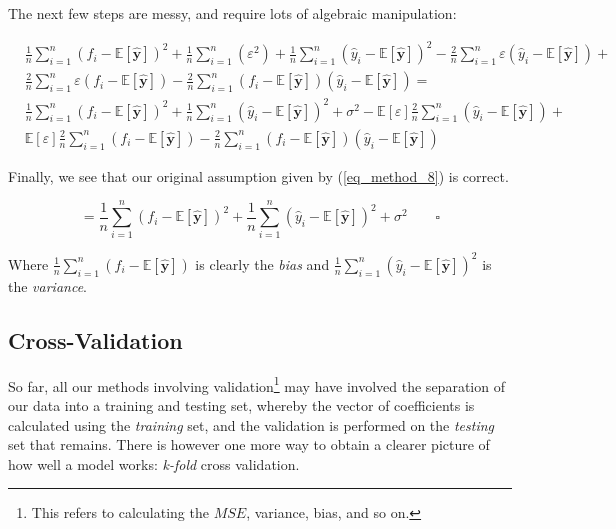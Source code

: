 \documentclass[a4paper,10pt,english]{article}
\begin{document}
The next few steps are messy, and require lots of algebraic manipulation:	

\begin{align*}	
& \frac{1}{n} \sum_{i=1}^{n} ( f_i - \mathbb{E}[\hat{\mathbf{y}}] )^2 
+ \frac{1}{n} \sum_{i=1}^{n} ( \varepsilon^2 )
+ \frac{1}{n} \sum_{i=1}^{n} ( \hat{y}_i - \mathbb{E}[\hat{\mathbf{y}}] )^2 
- \frac{2}{n} \sum_{i=1}^{n} \varepsilon ( \hat{y}_i - \mathbb{E}[\hat{\mathbf{y}}] )
+ \\ &\frac{2}{n} \sum_{i=1}^{n} \varepsilon ( f_i - \mathbb{E}[\hat{\mathbf{y}}] )
- \frac{2}{n} \sum_{i=1}^{n} ( f_i - \mathbb{E}[\hat{\mathbf{y}}] ) ( \hat{y}_i - \mathbb{E}[\hat{\mathbf{y}}] )
= \\ & \frac{1}{n} \sum_{i=1}^{n} ( f_i - \mathbb{E}[\hat{\mathbf{y}}] )^2 
+ \frac{1}{n} \sum_{i=1}^{n} ( \hat{y}_i - \mathbb{E}[\hat{\mathbf{y}}] )^2 
+ \sigma^2
- \mathbb{E}[\varepsilon] \frac{2}{n} \sum_{i=1}^{n} ( \hat{y}_i - \mathbb{E}[\hat{\mathbf{y}}] )
+ \\ & \mathbb{E}[\varepsilon] \frac{2}{n} \sum_{i=1}^{n} ( f_i - \mathbb{E}[\hat{\mathbf{y}}] )
-\frac{2}{n} \sum_{i=1}^{n} ( f_i - \mathbb{E}[\hat{\mathbf{y}}] ) ( \hat{y}_i - \mathbb{E}[\hat{\mathbf{y}}] )
\end{align*}

Finally, we see that our original assumption given by (\ref{eq_method_8}) is correct.

\begin{equation*}
= \frac{1}{n} \sum_{i=1}^{n} ( f_i - \mathbb{E}[\hat{\mathbf{y}}] )^2 
+ \frac{1}{n} \sum_{i=1}^{n} ( \hat{y}_i - \mathbb{E}[\hat{\mathbf{y}}] )^2 
+ \sigma^2 \qquad \square
\end{equation*}

Where $\frac{1}{n} \sum_{i=1}^{n} ( f_i - \mathbb{E}[\hat{\mathbf{y}}] )$ is clearly the \textit{bias} and
$\frac{1}{n} \sum_{i=1}^{n} ( \hat{y}_i - \mathbb{E}[\hat{\mathbf{y}}] )^2$ is the \textit{variance}.	

\subsection{Cross-Validation}

So far, all our methods involving validation\footnote{This refers to calculating the $MSE$, variance, bias, and so on.} may have involved the separation of our data into a training and testing set, whereby the vector of coefficients is calculated using the \textit{training} set, and the validation is performed on the \textit{testing} set that remains.	There is however one more way to obtain a clearer picture of how well a model works: \textit{k-fold} cross validation.	
\end{document}
